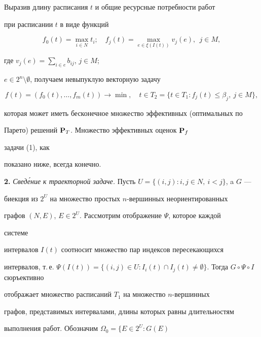  


Выразив длину расписания $t$ и общие ресурсные потребности работ 


при расписании $t$ в виде функций 


$$ 


f_0(t)=\max_{i\in N}t_i;\quad 


f_j(t)=\max_{e\in\xi(I(t))}v_j(e),\ \ j\in M, 


$$ 


где $v_j(e)=\sum\limits_{i\in e}b_{i j}$, $j\in M$; 


$e\in2^n\setminus\emptyset$, получаем невыпуклую векторную задачу 


\begin{equation} 


f(t)=(f_0(t),\dotsc,f_m(t))\to\min,\quad 


t\in T_2=\{t\in T_1:f_j(t)\le\beta_j,\ j\in M\}, 


\end{equation} 


которая может иметь бесконечное множество эффективных (оптимальных по 


Парето) решений $\bold P_T$. Множество эффективных оценок $\bold P_f$ 


задачи (1), как 


показано ниже, всегда конечно. 




 


{\bf 2.} {\it Свед\'ение к траекторной задаче.} Пусть $U=\{(i,j):i,j\in 


N,\ i<j\}$, a $G$ --- 


биекция из $2^U$ на множество простых $n$-вершинных неориентированных 


графов $(N,E)$, $E\in2^U$. Рассмотрим отображение $\Psi$, которое каждой 


системе 


интервалов $I(t)$ соотносит множество пар индексов пересекающихся 


интервалов, т.\,е. $\Psi(I(t))=\{(i,j)\in U:I_i(t)\cap 


I_j(t)\ne\emptyset\}$. Тогда $G\circ\Psi\circ I$ сюръективно 


отображает множество расписаний $T_1$ на множество $n$-вершинных 


графов, представимых интервалами, длины которых равны длительностям 


выполнения работ. Обозначим $\Omega_0=\{E\in2^U:G(E)$ 


